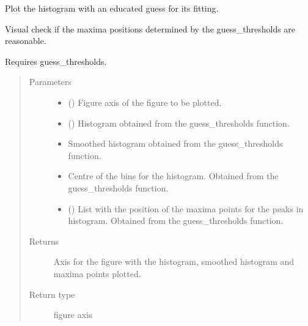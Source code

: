 \documentclass[letterpaper,10pt,english]{sphinxmanual}
\begin{document}
\begin{fulllineitems}
\label{\detokenize{tes:tes.calibration.plot_guess}}
\sphinxAtStartPar
Plot the histogram with an educated guess for its fitting.

\sphinxAtStartPar
Visual check if the maxima positions determined by the
guess\_thresholds are reasonable.

\sphinxAtStartPar
Requires guess\_thresholds.
\begin{quote}\begin{description}
\item[{Parameters}] \leavevmode\begin{itemize}
\item {} 
\sphinxAtStartPar
{} () \textendash{} Figure axis of the figure to be plotted.

\item {} 
\sphinxAtStartPar
{} () \textendash{} Histogram obtained from the guess\_thresholds function.

\item {} 
\sphinxAtStartPar
{} \textendash{} Smoothed histogram obtained from the guess\_thresholds
function.

\item {} 
\sphinxAtStartPar
{} \textendash{} Centre of the bins for the histogram. Obtained from the
guess\_thresholds function.

\item {} 
\sphinxAtStartPar
{} () \textendash{} List with the position of the maxima points for the
peaks in histogram. Obtained from the guess\_thresholds
function.

\end{itemize}

\item[{Returns}] \leavevmode
\sphinxAtStartPar
{} \textendash{} Axis for the figure with the histogram, smoothed histogram
and maxima points plotted.

\item[{Return type}] \leavevmode
\sphinxAtStartPar
figure axis

\end{description}\end{quote}

\end{fulllineitems}
\end{document}
